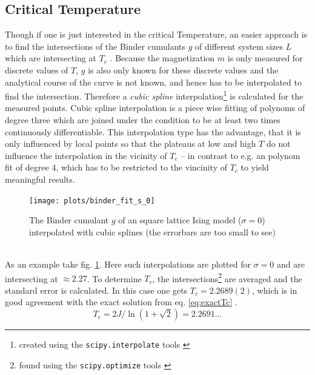 \subsection{Critical Temperature}
\label{ssec:binderIntersections}
    Though if one is just interested in the critical Temperature, an
    easier approach is to find the intersections of the Binder cumulants
    \(g\) of different system sizes \(L\) which are intersecting at
    \(T_c\) \cite{Binder1981}.
    Because the magnetization \(m\) is only measured for discrete values
    of \(T\), \(g\) is also only known for these discrete values and the
    analytical course of the curve is not known, and hence has
    to be interpolated to find the intersection. Therefore a \emph{cubic spline}
    interpolation\footnote{created using the \texttt{scipy.interpolate} tools \cite{scipy2001}}
    is calculated for the measured points.
    Cubic spline interpolation is a piece wise fitting of polynoms of
    degree three which are joined under the condition to be at least two
    times continuously differentiable. This interpolation type has the
    advantage, that it is only influenced by local points so that the
    plateaus at low and high \(T\) do not influence the interpolation in
    the vicinity of \(T_c\) -- in contrast to e.g. an polynom fit of
    degree 4, which has to be restricted to the vincinity of \(T_c\) to
    yield meaningful results.
    \begin{figure}[htbp]
        \centering
        \texttt{[image: plots/binder\_fit\_s\_0]}
        \caption[Example of a Binder cumulant to determine the critical temperature]
        {
            The Binder cumulant \(g\) of an square lattice Ising model
            (\(\sigma=0\)) interpolated with cubic splines
            (the errorbars are too small to see)\\
        }
        \label{fig:gettingCrit:binder_fit_s_0}
    \end{figure}\\
    As an example take fig. \ref{fig:gettingCrit:binder_fit_s_0}.
    Here such interpolations are plotted for \(\sigma=0\) and are
    intersecting at \(\approx 2.27\).
    To determine \(T_c\), the intersections\footnote{found using the \texttt{scipy.optimize} tools \cite{scipy2001}}
    are averaged and the standard error is calculated. In this case one
    gets \(T_c = 2.2689(2)\), which is in good agreement with the
    exact solution from eq. \eqref{eq:exactTc} \cite{Onsager1944}.
    \begin{equation}
        T_c = 2J/\ln(1+\sqrt 2) = 2.2691...
        \label{eq:exactTc}
    \end{equation}
